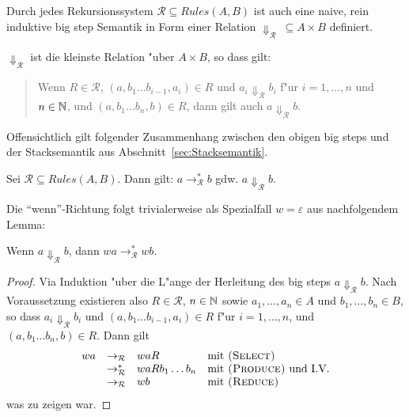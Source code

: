 \documentclass[12pt,a4paper,final]{article}
\begin{document}
Durch jedes Rekursionssystem \mbox{$\mathcal{R} \subseteq \mathit{Rules}(A,B)$} ist auch
eine naive, rein induktive big step Semantik in Form einer Relation
\mbox{$\Downarrow_{\mathcal{R}}\ \subseteq A \times B$} definiert.
\begin{definition}
  \mbox{$\Downarrow_{\mathcal{R}}$} ist die kleinste Relation "uber $A \times B$, so dass gilt:
  \begin{quote}
    Wenn $R \in \mathcal{R}$, $(a,b_1 \ldots b_{i-1},a_i) \in R$ und $a_i \Downarrow_{\mathcal{R}} b_i$
    f"ur $i=1,\ldots,n$ und $n \in \mathbb N$, und $(a,b_1 \ldots b_n,b) \in R$, dann gilt auch
    $a \Downarrow_{\mathcal{R}} b$.
  \end{quote}
\end{definition}
Offensichtlich gilt folgender Zusammenhang zwischen den obigen big steps und der Stacksemantik
aus Abschnitt~\ref{sec:Stacksemantik}.
\begin{theorem}
  Sei \mbox{$\mathcal{R} \subseteq \mathit{Rules}(A,B)$}. Dann gilt:
 \mbox{$a \rightarrow_{\mathcal{R}}^* b$} gdw. \mbox{$a \Downarrow_{\mathcal{R}} b$}.
\end{theorem}
Die ``wenn''-Richtung folgt trivialerweise als Spezialfall \mbox{$w = \varepsilon$} aus nachfolgendem
Lemma:
\begin{lemma}
  Wenn \mbox{$a \Downarrow_{\mathcal{R}} b$}, dann \mbox{$wa \rightarrow_{\mathcal{R}}^* wb$}.
\end{lemma}

\begin{proof}
  Via Induktion "uber die L"ange der Herleitung des big steps \mbox{$a \Downarrow_{\mathcal{R}} b$}.
  Nach Voraussetzung existieren also \mbox{$R \in \mathcal{R}$}, \mbox{$n \in \mathbb N$} sowie
  \mbox{$a_1,\ldots,a_n \in A$} und \mbox{$b_1,\ldots,b_n \in B$}, so dass
  \mbox{$a_i \Downarrow_{\mathcal{R}} b_i$} und \mbox{$(a,b_1 \ldots b_{i-1},a_i) \in R$}
  f"ur \mbox{$i=1,\ldots,n$}, und \mbox{$(a,b_1 \ldots b_n,b) \in R$}.
  Dann gilt
  \[\begin{array}{rcll}
    wa
    & \rightarrow_{\mathcal{R}}   & waR               & \text{mit \textsc{(Select)}} \\
    & \rightarrow_{\mathcal{R}}^* & waRb_1 \ldots b_n & \text{mit \textsc{(Produce)} und I.V.} \\
    & \rightarrow_{\mathcal{R}}   & wb                & \text{mit \textsc{(Reduce)}} \\
  \end{array}\]
  was zu zeigen war.
\end{proof}
\end{document}
